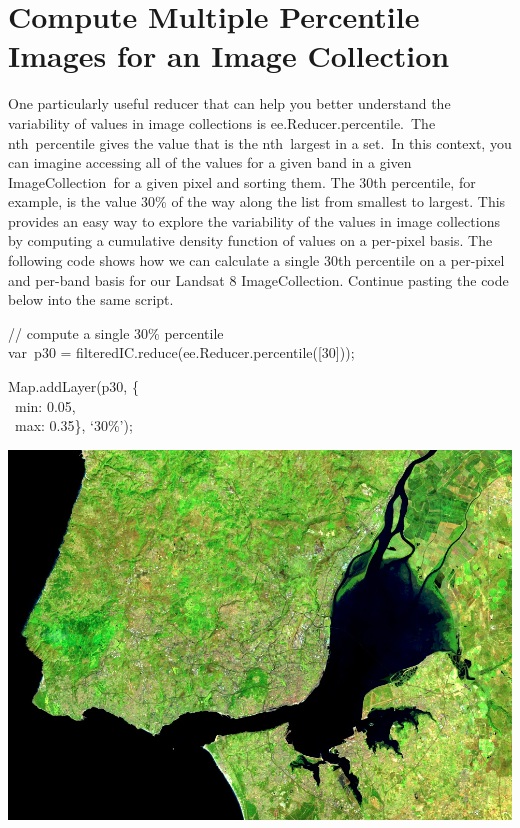 \documentclass[
  letterpaper,
  DIV=11,
  numbers=noendperiod]{scrreprt}
\begin{document}
\hypertarget{compute-multiple-percentile-images-for-an-image-collection}{%
\section{Compute Multiple Percentile Images for an Image
Collection}\label{compute-multiple-percentile-images-for-an-image-collection}}

One particularly useful reducer that can help you better understand the
variability of values in image collections is ee.Reducer.percentile.~The
nth~percentile gives the value that is the nth~largest in a set.~In this
context, you can imagine accessing all of the values for a given band in
a given ImageCollection~for a given pixel and sorting them. The 30th
percentile, for example, is the value 30\% of the way along the list
from smallest to largest. This provides an easy way to explore the
variability of the values in image collections by computing a cumulative
density function of values on a per-pixel basis. The following code
shows how we can calculate a single 30th percentile on a per-pixel and
per-band basis for our Landsat 8 ImageCollection. Continue pasting the
code below into the same script.

// compute a single 30\% percentile\\
var~p30 = filteredIC.reduce(ee.Reducer.percentile({[}30{]}));

Map.addLayer(p30, \{\\
\hspace*{0.333em} ~min: 0.05,\\
\hspace*{0.333em} ~max: 0.35\}, `30\%');

\includegraphics{./F4/image74.png}
\end{document}
